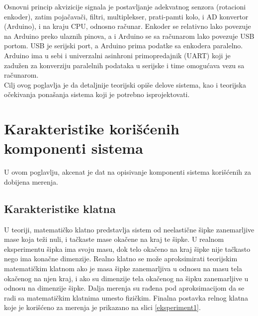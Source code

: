 \documentclass[a4paper, 12pt, diplomski]{etf}
\begin{document}
\noindent
Osnovni princip akvizicije signala je postavljanje adekvatnog senzora (rotacioni enkoder), zatim pojačavači, filtri, multiplekser, prati-pamti kolo, i AD konvertor (Arduino), i na kraju CPU, odnosno računar.
Enkoder se relativno lako povezuje na Arduino preko ulaznih pinova, a i Arduino se sa računarom lako povezuje USB portom. USB je serijski port, a Arduino prima podatke sa enkodera paralelno. Arduino ima u sebi i univerzalni asinhroni primopredajnik (UART) koji je zadužen za konverziju paralelnih podataka u serijske i time omogućava vezu sa računarom.
\cite{ems} \\

Cilj ovog poglavlja je da detaljnije teorijski opiše delove sistema, kao i teorijska očekivanja ponašanja sistema koji je potrebno isprojektovati.



\newpage

\section{Karakteristike korišćenih komponenti sistema}
\label{sec:Karakteristike}

U ovom poglavlju, akcenat je dat na opisivanje komponenti sistema korišćenih za dobijena merenja.

\subsection{Karakteristike klatna}

U teoriji, matematičko klatno predstavlja sistem od neelastične šipke zanemarljive mase koja teži nuli, i tačkaste mase okačene na kraj te šipke. U realnom eksperimentu šipka ima svoju masu, dok telo okačeno na kraj šipke nije tačkasto nego ima konačne dimenzije. Realno klatno se može aproksimirati teorijskim matematičkim klatnom ako je masa šipke zanemarljiva u odnosu na masu tela okačenog na njen kraj, i ako su dimenzije tela okačenog na šipku zanemarljive u odnosu na dimenzije šipke. Dalja merenja su rađena pod aproksimacijom da se radi sa matematičkim klatnima umesto fizičkim. Finalna postavka relnog klatna koje je korišćeno za merenja je prikazano na slici \ref{eksperiment1}. 
\end{document}
